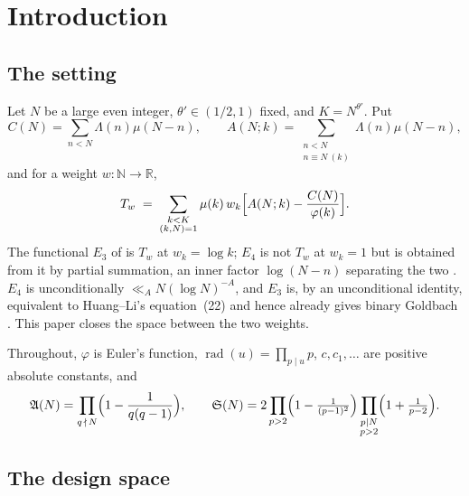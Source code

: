 \documentclass[11pt,a4paper]{article}
\theoremstyle{plain}
\theoremstyle{definition}
\theoremstyle{remark}
\renewcommand{\SS}{\mathfrak{S}}
\newcommand{\AAA}{\mathfrak{A}}
\DeclareMathOperator{\rad}{rad}
\begin{document}
\section{Introduction}

\subsection{The setting}

Let $N$ be a large even integer, $\theta'\in(1/2,1)$ fixed, and
$K=N^{\theta'}$. Put
\begin{equation}\label{eq:C}
  C(N)=\sum_{n<N}\Lambda(n)\mu(N-n),
  \qquad
  A(N;k)=\sum_{\substack{n<N\\ n\equiv N\ (k)}}\Lambda(n)\mu(N-n),
\end{equation}
and for a weight $w:\mathbb N\to\mathbb R$,
\begin{equation}\label{eq:Tw}
  T_w \;=\;\sum_{\substack{k<K\\ (k,N)=1}}\mu(k)\,w_k
     \Bigl[A(N;k)-\frac{C(N)}{\varphi(k)}\Bigr].
\end{equation}
The functional $E_3$ of \cite{HL} is $T_w$ at $w_k=\log k$; $E_4$ is
not $T_w$ at $w_k=1$ but is obtained from it by partial summation, an
inner factor $\log(N-n)$ separating the two \cite[Cor.~2]{P1}. $E_4$ is
unconditionally $\ll_A N(\log N)^{-A}$, and $E_3$ is, by an
unconditional identity, equivalent to Huang--Li's equation~(22) and
hence already gives binary Goldbach \cite{P1}. This paper closes the
space between the two weights.

Throughout, $\varphi$ is Euler's function, $\rad(u)=\prod_{p\mid u}p$,
$c,c_1,\dots$ are positive absolute constants, and
\begin{equation}\label{eq:AN}
  \AAA(N)=\prod_{q\,\nmid\,N}\Bigl(1-\frac{1}{q(q-1)}\Bigr),
  \qquad
  \SS(N)=2\prod_{p>2}\Bigl(1-\tfrac{1}{(p-1)^2}\Bigr)
          \prod_{\substack{p\mid N\\ p>2}}\Bigl(1+\tfrac{1}{p-2}\Bigr).
\end{equation}

\subsection{The design space}
\end{document}
